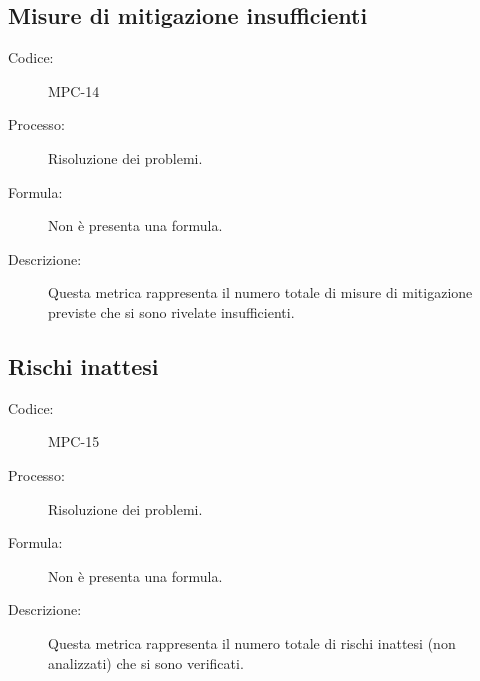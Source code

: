 \subsection{Misure di mitigazione insufficienti}
\begin{description}
    \item[Codice:] MPC-14
    \item[Processo:] Risoluzione dei problemi.
    \item[Formula:] Non è presenta una formula.
    \item[Descrizione:] Questa metrica rappresenta il numero totale di misure di mitigazione previste che si sono rivelate insufficienti.
\end{description}

\subsection{Rischi inattesi}
\begin{description}
    \item[Codice:] MPC-15
    \item[Processo:] Risoluzione dei problemi.
    \item[Formula:] Non è presenta una formula.
    \item[Descrizione:] Questa metrica rappresenta il numero totale di rischi inattesi (non analizzati) che si sono verificati.
\end{description}

